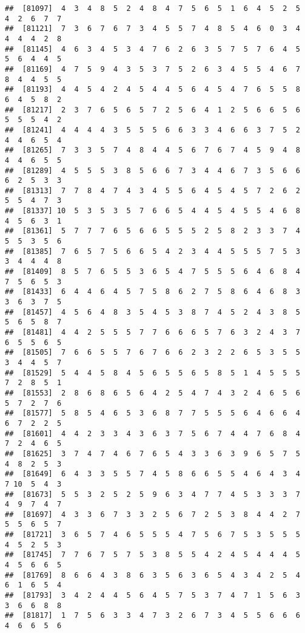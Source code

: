 \documentclass[
]{book}
\begin{document}
\begin{verbatim}
##  [81097]  4  3  4  8  5  2  4  8  4  7  5  6  5  1  6  4  5  2  5  4  2  6  7  7
##  [81121]  7  3  6  7  6  7  3  4  5  5  7  4  8  5  4  6  0  3  4  4  4  4  2  8
##  [81145]  4  6  3  4  5  3  4  7  6  2  6  3  5  7  5  7  6  4  5  5  6  4  4  5
##  [81169]  4  7  5  9  4  3  5  3  7  5  2  6  3  4  5  5  4  6  7  8  4  4  5  5
##  [81193]  4  4  5  4  2  4  5  4  4  5  6  4  5  4  7  6  5  5  8  6  4  5  8  2
##  [81217]  2  3  7  6  5  6  5  7  2  5  6  4  1  2  5  6  6  5  6  5  5  5  4  2
##  [81241]  4  4  4  4  3  5  5  5  6  6  3  3  4  6  6  3  7  5  2  4  4  6  5  4
##  [81265]  7  3  3  5  7  4  8  4  4  5  6  7  6  7  4  5  9  4  8  4  4  6  5  5
##  [81289]  4  5  5  5  3  8  5  6  6  7  3  4  4  6  7  3  5  6  6  6  2  5  3  3
##  [81313]  7  7  8  4  7  4  3  4  5  5  6  4  5  4  5  7  2  6  2  5  5  4  7  3
##  [81337] 10  5  3  5  3  5  7  6  6  5  4  4  5  4  5  5  4  6  8  4  5  6  3  1
##  [81361]  5  7  7  7  6  5  6  6  5  5  5  2  5  8  2  3  3  7  4  5  5  3  5  6
##  [81385]  7  6  5  7  5  6  6  5  4  2  3  4  4  5  5  5  7  5  3  3  4  4  4  8
##  [81409]  8  5  7  6  5  5  3  6  5  4  7  5  5  5  6  4  6  8  4  7  5  6  5  3
##  [81433]  6  4  4  6  4  5  7  5  8  6  2  7  5  8  6  4  6  8  3  3  6  3  7  5
##  [81457]  4  5  6  4  8  3  5  4  5  3  8  7  4  5  2  4  3  8  5  5  6  5  8  7
##  [81481]  4  4  2  5  5  5  7  7  6  6  6  5  7  6  3  2  4  3  7  6  5  5  6  5
##  [81505]  7  6  6  5  5  7  6  7  6  6  2  3  2  2  6  5  3  5  5  3  4  4  5  7
##  [81529]  5  4  4  5  8  4  5  6  5  5  6  5  8  5  1  4  5  5  5  7  2  8  5  1
##  [81553]  2  8  6  8  6  5  6  4  2  5  4  7  4  3  2  4  6  5  6  5  7  2  7  6
##  [81577]  5  8  5  4  6  5  3  6  8  7  7  5  5  5  6  4  6  6  4  6  7  2  2  5
##  [81601]  4  4  2  3  3  4  3  6  3  7  5  6  7  4  4  7  6  8  4  7  2  4  6  5
##  [81625]  3  7  4  7  4  6  7  6  5  4  3  3  6  3  9  6  5  7  5  4  8  2  5  3
##  [81649]  6  4  3  3  5  5  7  4  5  8  6  6  5  5  4  6  4  3  4  7 10  5  4  3
##  [81673]  5  5  3  2  5  2  5  9  6  3  4  7  7  4  5  3  3  3  7  4  9  7  4  7
##  [81697]  4  3  3  6  7  3  3  2  5  6  7  2  5  3  8  4  4  2  7  5  5  6  5  7
##  [81721]  3  6  5  7  4  6  5  5  5  4  7  5  6  7  5  3  5  5  5  4  5  2  5  3
##  [81745]  7  7  6  7  5  7  5  3  8  5  5  4  2  4  5  4  4  4  5  4  5  6  6  5
##  [81769]  8  6  6  4  3  8  6  3  5  6  3  6  5  4  3  4  2  5  4  6  1  6  5  4
##  [81793]  3  4  2  4  4  5  6  4  5  7  5  3  7  4  7  1  5  6  3  3  6  6  8  8
##  [81817]  1  7  5  6  3  3  4  7  3  2  6  7  3  4  5  5  6  6  6  4  6  6  5  6

\end{verbatim}
\end{document}
